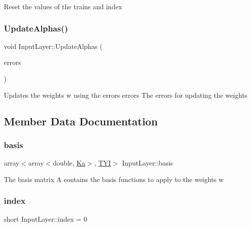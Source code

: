 Reset the values of the trains and index \mbox{\label{class_input_layer_ade39f022f70cab37b342e34ac18b8baf}} 
\subsubsection{\texorpdfstring{Update\+Alphas()}{UpdateAlphas()}}
{\footnotesize\ttfamily void Input\+Layer\+::\+Update\+Alphas (\begin{DoxyParamCaption}\item[{array$<$ array$<$ double, \mbox{\hyperlink{_constants_8h_a6108cec236ef7a2e1d3259931de87186}{T}} $>$, \mbox{\hyperlink{_constants_8h_a12148c0e36153a905f4f6ef1afdbb27e}{C\+L\+A\+S\+S\+ES}} $>$ \&}]{errors }\end{DoxyParamCaption})}

Updates the weights w using the errors  errors The errors for updating the weights 

\subsection{Member Data Documentation}
\mbox{\label{class_input_layer_a388d91869f6d433d8c8a74bf5a0ece24}} 
\subsubsection{\texorpdfstring{basis}{basis}}
{\footnotesize\ttfamily array$<$array$<$double, \mbox{\hyperlink{_constants_8h_a63d387da07d2165955fa3ed13918bb31}{Ka}}$>$, \mbox{\hyperlink{_constants_8h_a45bcfb91788c7d66f5de11604fb1eb6e}{T\+YI}}$>$ Input\+Layer\+::basis\hspace{0.3cm}{\ttfamily [protected]}}

The basis matrix A contains the basis functions to apply to the weights w \mbox{\label{class_input_layer_af30abc59c541b1dcc0db0f4ca3072f1d}} 
\subsubsection{\texorpdfstring{index}{index}}
{\footnotesize\ttfamily short Input\+Layer\+::index = 0\hspace{0.3cm}{\ttfamily [protected]}}

